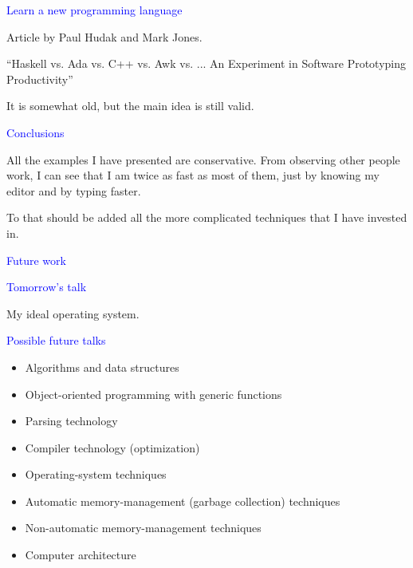 \documentclass{slides}
\newcommand{\ti}[1]{\begin{center}\Large{\textcolor{blue}{#1}}\end{center}}
\begin{document}
\begin{slide}\ti{Learn a new programming language}

Article by Paul Hudak and Mark Jones.

``Haskell vs. Ada vs. C++ vs. Awk vs. ... An Experiment in Software
Prototyping Productivity''

It is somewhat old, but the main idea is still valid.

\vfill\end{slide}
\begin{slide}\ti{}

\vfill\end{slide}
\begin{slide}\ti{Conclusions}

All the examples I have presented are conservative.  From observing
other people work, I can see that I am twice as fast as most of them,
just by knowing my editor and by typing faster.

To that should be added all the more complicated techniques that I
have invested in.

\vfill\end{slide}
\begin{slide}\ti{Future work}

\vfill\end{slide}
\begin{slide}\ti{Tomorrow's talk}

My ideal operating system.

\vfill\end{slide}
\begin{slide}\ti{Possible future talks}

  \begin{itemize}
  \item Algorithms and data structures
  \item Object-oriented programming with generic functions
  \item Parsing technology
  \item Compiler technology (optimization)
  \item Operating-system techniques
  \item Automatic memory-management (garbage collection) techniques
  \item Non-automatic memory-management techniques
  \item Computer architecture
  \end{itemize}

\vfill\end{slide}



\end{document}
